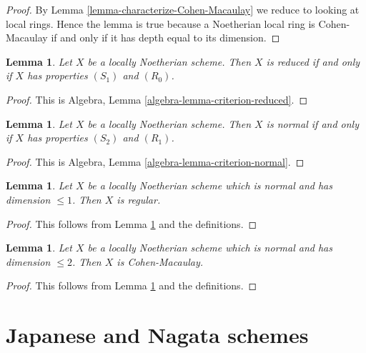 \documentclass{stacks-project}
\theoremstyle{plain}
\newtheorem{lemma}[subsection]{Lemma}
\theoremstyle{definition}
\theoremstyle{remark}
\numberwithin{equation}{subsection}
\begin{document}
\begin{proof}
By Lemma \ref{lemma-characterize-Cohen-Macaulay}
we reduce to looking at local rings.
Hence the lemma is true because a Noetherian local ring is Cohen-Macaulay
if and only if it has depth equal to its dimension.
\end{proof}

\begin{lemma}
\label{lemma-criterion-reduced}
Let $X$ be a locally Noetherian scheme.
Then $X$ is reduced if and only if $X$ has properties $(S_1)$ and $(R_0)$.
\end{lemma}

\begin{proof}
This is Algebra, Lemma \ref{algebra-lemma-criterion-reduced}.
\end{proof}

\begin{lemma}
\label{lemma-criterion-normal}
Let $X$ be a locally Noetherian scheme.
Then $X$ is normal if and only if $X$ has properties $(S_2)$ and $(R_1)$.
\end{lemma}

\begin{proof}
This is Algebra, Lemma \ref{algebra-lemma-criterion-normal}.
\end{proof}

\begin{lemma}
\label{lemma-normal-dimension-1-regular}
Let $X$ be a locally Noetherian scheme which is normal and
has dimension $\leq 1$. Then $X$ is regular.
\end{lemma}

\begin{proof}
This follows from Lemma \ref{lemma-criterion-normal} and the definitions.
\end{proof}

\begin{lemma}
\label{lemma-normal-dimension-2-Cohen-Macaulay}
Let $X$ be a locally Noetherian scheme which is normal and
has dimension $\leq 2$. Then $X$ is Cohen-Macaulay.
\end{lemma}

\begin{proof}
This follows from Lemma \ref{lemma-criterion-normal} and the definitions.
\end{proof}







\section{Japanese and Nagata schemes}
\label{section-nagata}
\end{document}
